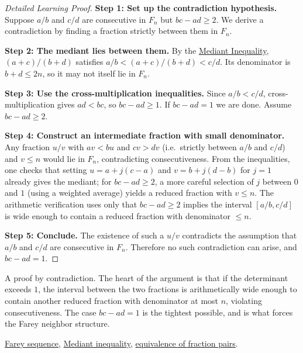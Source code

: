 \begin{proof}[Detailed Learning Proof]
\LRAProofBodyStart
\textbf{Step 1: Set up the contradiction hypothesis.}
Suppose $a/b$ and $c/d$ are consecutive in $F_n$ but $bc - ad \geq 2$.
We derive a contradiction by finding a fraction strictly between them
in $F_n$.

\textbf{Step 2: The mediant lies between them.}
By the \hyperref[thm:mediant-inequality]{Mediant Inequality},
$(a+c)/(b+d)$ satisfies $a/b < (a+c)/(b+d) < c/d$.
Its denominator is $b+d \leq 2n$, so it may not itself lie in $F_n$.

\textbf{Step 3: Use the cross-multiplication inequalities.}
Since $a/b < c/d$, cross-multiplication gives $ad < bc$, so $bc - ad \geq 1$.
If $bc - ad = 1$ we are done.  Assume $bc - ad \geq 2$.

\textbf{Step 4: Construct an intermediate fraction with small denominator.}
Any fraction $u/v$ with $av < bu$ and $cv > dv$ (i.e.\ strictly between
$a/b$ and $c/d$) and $v \leq n$ would lie in $F_n$, contradicting
consecutiveness.  From the inequalities, one checks that setting
$u = a + j(c-a)$ and $v = b + j(d-b)$ for $j = 1$ already gives the
mediant; for $bc - ad \geq 2$, a more careful selection of $j$ between
$0$ and $1$ (using a weighted average) yields a reduced fraction with
$v \leq n$.  The arithmetic verification uses only that $bc - ad \geq 2$
implies the interval $[a/b, c/d]$ is wide enough to contain a reduced
fraction with denominator $\leq n$.

\textbf{Step 5: Conclude.}
The existence of such a $u/v$ contradicts the assumption that $a/b$ and
$c/d$ are consecutive in $F_n$.  Therefore no such contradiction can
arise, and $bc - ad = 1$.
\end{proof}

\begin{remark*}
A proof by contradiction.  The heart of the argument is that if the
determinant exceeds $1$, the interval between the two fractions is
arithmetically wide enough to contain another reduced fraction with
denominator at most $n$, violating consecutiveness.  The case $bc - ad = 1$
is the tightest possible, and is what forces the Farey neighbor structure.
\end{remark*}

\begin{dependencies}
\hyperref[def:farey-sequence]{Farey sequence},
\hyperref[thm:mediant-inequality]{Mediant inequality},
\hyperref[thm:fraction-pair-equivalence]{equivalence of fraction pairs}.
\end{dependencies}

\clearpage
